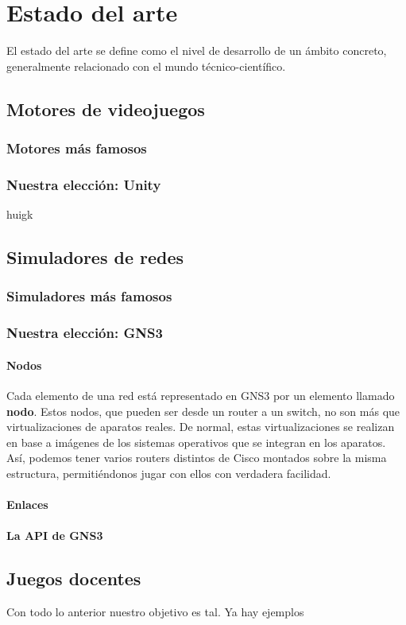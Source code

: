 \chapter{Estado del arte}\label{chap:ArtState}

El estado del arte se define como el nivel de desarrollo de un ámbito concreto, generalmente relacionado con el mundo técnico-científico.

\section{Motores de videojuegos}

\subsection{Motores más famosos}

\subsection{Nuestra elección: Unity}

huigk

\section{Simuladores de redes}

\subsection{Simuladores más famosos}

\subsection{Nuestra elección: GNS3}

\subsubsection{Nodos}
Cada elemento de una red está representado en GNS3 por un elemento llamado \textbf{nodo}. Estos nodos, que pueden ser desde un router a un switch, no son más que virtualizaciones de aparatos reales. De normal, estas virtualizaciones se realizan en base a imágenes de los sistemas operativos que se integran en los aparatos. Así, podemos tener varios routers distintos de Cisco montados sobre la misma estructura, permitiéndonos jugar con ellos con verdadera facilidad.

\subsubsection{Enlaces}

\subsubsection{La API de GNS3}



\section{Juegos docentes}

Con todo lo anterior nuestro objetivo es tal. Ya hay ejemplos